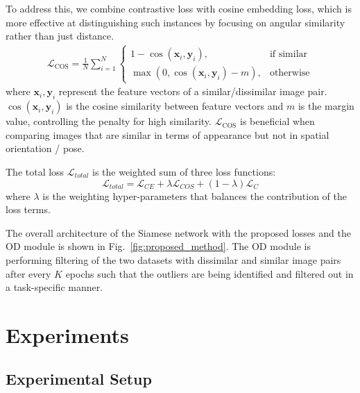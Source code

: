 \documentclass[lettersize,journal]{IEEEtran}
\begin{document}
To address this, we combine contrastive loss with cosine embedding loss, which is more effective at distinguishing such instances by focusing on angular similarity rather than just distance.
\begin{equation}
\begin{split}
\mathcal{L}_{\text{COS}} = 
\frac{1}{N} \sum_{i=1}^{N}
\begin{cases}
1 - \cos(\mathbf{x}_i, \mathbf{y}_i), &\text{if similar} \\
\max(0, \cos(\mathbf{x}_i, \mathbf{y}_i) - m), &\text{otherwise}
\end{cases}
\end{split}
\label{eq:cosine_embedding_loss}
\end{equation}
where $ \mathbf{x}_i, \mathbf{y}_i $ represent the feature vectors of a similar/dissimilar image pair. $ \cos(\mathbf{x}_i, \mathbf{y}_i) $ is the cosine similarity between feature vectors and $m$ is the margin value, controlling the penalty for high similarity. $\mathcal{L}_{\text{COS}}$ is beneficial when comparing images that are similar in terms of appearance but not in spatial orientation / pose.

The total loss $ \mathcal{L}_{total} $ is the weighted sum of three loss functions:
\begin{equation}
    \mathcal{L}_{total} = \mathcal{L}_{CE} + \lambda \mathcal{L}_{COS} + (1-\lambda) \mathcal{L}_{C}
    \label{eq:combined_loss}
\end{equation}
where $ \lambda $ is the weighting hyper-parameters that balances the contribution of the loss terms.

The overall architecture of the Siamese network with the proposed losses and the OD module is shown in Fig.~\ref{fig:proposed_method}. The OD module is performing filtering of the two datasets with dissimilar and similar image pairs after every $K$ epochs such that the outliers are being identified and filtered out in a task-specific manner.


\section{Experiments}
\label{sec:exp}
\subsection{Experimental Setup}
\end{document}

